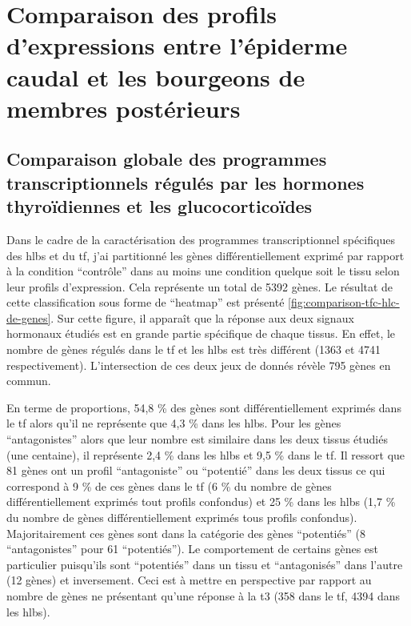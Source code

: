 \documentclass[../main.tex]{subfiles}
\begin{document}
\chapter{Comparaison des profils d'expressions entre l'épiderme caudal et les bourgeons de membres postérieurs}

\section{Comparaison globale des programmes transcriptionnels régulés par les hormones thyroïdiennes et les glucocorticoïdes}

	Dans le cadre de la caractérisation des programmes transcriptionnel spécifiques des \glspl{hlb} et du \gls{tf}, j'ai partitionné les gènes différentiellement exprimé par rapport à la condition ``contrôle'' dans au moins une condition quelque soit le tissu selon leur profils d'expression.
	Cela représente un total de 5392 gènes.
	Le résultat de cette classification sous forme de ``heatmap'' est présenté \autoref{fig:comparison-tfc-hlc-de-genes}.
	Sur cette figure, il apparaît que la réponse aux deux signaux hormonaux étudiés est en grande partie spécifique de chaque tissus.
	En effet, le nombre de gènes régulés dans le \gls{tf} et les \glspl{hlb} est très différent (1363 et 4741 respectivement).
	L'intersection de ces deux jeux de donnés révèle 795 gènes en commun.
	\par
	En terme de proportions, 54,8 \% des gènes sont différentiellement exprimés dans le \gls{tf} alors qu'il ne représente que 4,3 \% dans les \glspl{hlb}.
	Pour les gènes ``antagonistes'' alors que leur nombre est similaire dans les deux tissus étudiés (une centaine), il représente 2,4 \% dans les \glspl{hlb} et 9,5 \% dans le \gls{tf}.
	Il ressort que 81 gènes ont un profil ``antagoniste'' ou ``potentié'' dans les deux tissus ce qui correspond à 9 \% de ces gènes dans le \gls{tf} (6 \% du nombre de gènes différentiellement exprimés tout profils confondus) et 25 \% dans les \glspl{hlb} (1,7 \% du nombre de gènes différentiellement exprimés tous profils confondus).
	Majoritairement ces gènes sont dans la catégorie des gènes ``potentiés'' (8 ``antagonistes'' pour 61 ``potentiés'').
	Le comportement de certains gènes est particulier puisqu'ils sont ``potentiés'' dans un tissu et ``antagonisés'' dans l'autre (12 gènes) et inversement.
	Ceci est à mettre en perspective par rapport au nombre de gènes ne présentant qu'une réponse à la \gls{t3} (358 dans le \gls{tf}, 4394 dans les \glspl{hlb}).
	\par
\end{document}
